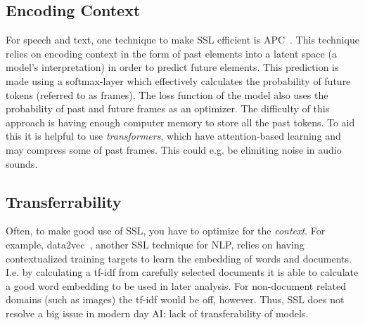 \documentclass[10pt,twocolumn,letterpaper]{article}
\begin{document}
\subsection{Encoding Context}
For speech and text, one technique to make \gls{SSL} efficient is \gls{APC}~\cite{chung2020generative}. This technique relies on encoding context in the form of past elements into a latent space (a model's interpretation) in order to predict future elements. This prediction is made using a softmax-layer which effectively calculates the probability of future tokens (referred to as frames). The loss function of the model also uses the probability of past and future frames as an optimizer. The difficulty of this approach is having enough computer memory to store all the past tokens. To aid this it is helpful to use \textit{transformers}, which have attention-based learning and may compress some of past frames. This could e.g. be elimiting noise in audio sounds.

\subsection{Transferrability}
Often, to make good use of \gls{SSL}, you have to optimize for the \textit{context}. For example, data2vec~\cite{data2vec}, another \gls{SSL} technique for \gls{NLP}, relies on having contextualized training targets to learn the embedding of words and documents. I.e. by calculating a \gls{tf-idf} from carefully selected documents it is able to calculate a good word embedding to be used in later analysis. For non-document related domains (such as images) the \gls{tf-idf} would be off, however. Thus, \gls{SSL} does not resolve a big issue in modern day \gls{AI}: lack of transferability of models.
\end{document}
